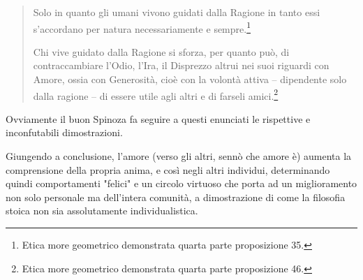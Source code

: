 \documentclass[a4paper,12pt,oneside]{article}%
\begin{document}
\begin{quotation}
	Solo in quanto gli umani vivono guidati dalla Ragione in
	tanto essi s’accordano per natura necessariamente e sempre.\footnote{Etica more geometrico demonstrata quarta parte proposizione 35.}
	
	Chi vive guidato dalla Ragione si sforza, per quanto può, di
	contraccambiare l’Odio, l’Ira, il Disprezzo altrui nei suoi riguardi con Amore, ossia con Generosità, cioè con la volontà attiva
	– dipendente solo dalla ragione – di essere utile agli altri e di
	farseli amici.\footnote{Etica more geometrico demonstrata quarta parte proposizione 46.}
\end{quotation}

Ovviamente il buon Spinoza fa seguire a questi enunciati le rispettive e inconfutabili dimostrazioni.

Giungendo a conclusione, l'amore (verso gli altri, sennò che amore è) aumenta la comprensione della propria anima, e così negli altri individui, determinando quindi comportamenti "felici" e un circolo virtuoso che porta ad un miglioramento non solo personale ma dell'intera comunità, a dimostrazione di come la filosofia stoica non sia assolutamente individualistica.
\end{document}
